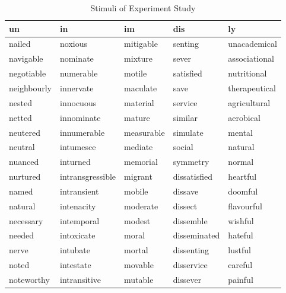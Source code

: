 \begin{longtabu} to \textwidth {XXXXX}

					\caption{Stimuli of Experiment Study}
			\label{Stimuli of Experiment Study}
			
				\endfirsthead
			\endhead
			\midrule
	\textbf{un}   & \textbf{in}      & \textbf{im}     & \textbf{dis}   & \textbf{ly}     \\
	\midrule
	nailed        & noxious          & mitigable       & senting        & unacademical    \\
	navigable     & nominate         & mixture         & sever          & associational   \\
	negotiable    & numerable        & motile          & satisfied      & nutritional     \\
	neighbourly   & innervate        & maculate        & save           & therapeutical   \\
	nested        & innocuous        & material        & service        & agricultural    \\
					netted        & innominate       & mature          & similar        & aerobical       \\
					neutered      & innumerable      & measurable      & simulate       & mental          \\
	neutral       & intumesce        & mediate         & social         & natural         \\
	nuanced       & inturned         & memorial        & symmetry       & normal          \\		
				nurtured      & intransgressible & migrant         & dissatisfied   & heartful        \\
				named         & intransient      & mobile          & dissave        & doomful         \\
				natural       & intenacity       & moderate        & dissect        & flavourful      \\
				necessary     & intemporal       & modest          & dissemble      & wishful         \\
				needed        & intoxicate       & moral           & disseminated   & hateful         \\
				nerve         & intubate         & mortal          & dissenting     & lustful         \\
				noted         & intestate        & movable         & disservice     & careful         \\
				noteworthy    & intransitive     & mutable         & dissever       & painful         \\

\end{longtabu}
